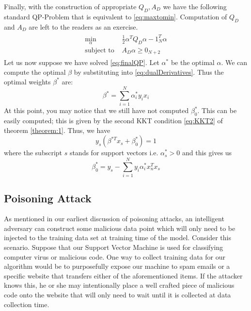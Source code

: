 \documentclass[twoside]{article}
\begin{document}
Finally, with the construction of appropriate $Q_{D}, A_D$ we have the following standard QP-Problem that is equivalent to \ref{eq:maxtomin}. Computation of $Q_{D}$ and $A_D$ are left to the readers as an exercise.
\begin{align} \label{eq:finalQP}
\begin{split}
    \min_{\alpha} &\frac{1}{2}\alpha^{T}Q_{D}\alpha - 1_{N}^{T}\alpha\\
    \text{subject to }
    &A_{D}\alpha \geq 0_{N+2}
\end{split}
\end{align}
Let us now suppose we have solved \ref{eq:finalQP}. Let $\alpha^{*}$ be the optimal $\alpha$. We can compute the optimal $\beta$ by substituting into \textcolor{blue}{\ref{eq:dualDerivatives}}. Thus the optimal weights $\beta^{*}$ are:
\begin{equation*}
    \beta^{*} = \sum_{i=1}^{N}\alpha_{i}^{*}y_{i}x_{i}
\end{equation*}
At this point, you may notice that we still have not computed $\beta_{0}^{*}$. This can be easily computed; this is given by the second KKT condition \textcolor{blue}{\ref{eq:KKT2}} of theorem \textcolor{blue}{\ref{theorem:1}}. Thus, we have
\begin{equation*}
    y_{s}(\beta^{*T}x_{s} + \beta_{0}^{*}) = 1
\end{equation*}
where the subscript $s$ stands for support vectors i.e. $\alpha_{s}^{*} > 0$ and this gives us
\begin{equation*}
    \beta_{0}^{*} = y_{s} - \sum_{i=1}^{N}y_{i}\alpha_{i}^{*}x_{n}^{T}x_{s}
\end{equation*}

\subsection{Poisoning Attack}

As mentioned in our earliest discussion of poisoning attacks, an intelligent adversary can construct some malicious data point which will only need to be injected to the training data set at training time of the model. Consider this scenario. Suppose that our Support Vector Machine is used for classifying computer virus or malicious code. One way to collect training data for our algorithm would be to purposefully expose our machine to spam emails or a specific website that transfers either of the aforementioned items. If the attacker knows this, he or she may intentionally place a well crafted piece of malicious code onto the website that will only need to wait until it is collected at data collection time. 
\end{document}
